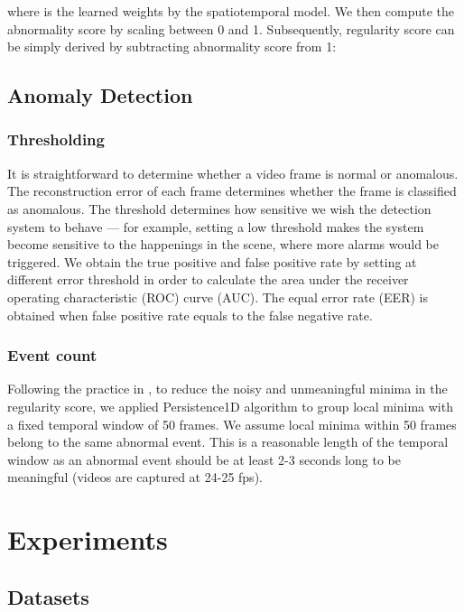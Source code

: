 \documentclass[a4paper]{article}
\begin{document}
where  is the learned weights by the spatiotemporal model. We then compute the abnormality score  by scaling  between 0 and 1. Subsequently, regularity score  can be simply derived by subtracting abnormality score from 1:





\subsection{Anomaly Detection}

\subsubsection{Thresholding} It is straightforward to determine whether a video frame is normal or anomalous. The reconstruction error of each frame determines whether the frame is classified as anomalous. The threshold determines how sensitive we wish the detection system to behave --- for example, setting a low threshold makes the system become sensitive to the happenings in the scene, where more alarms would be triggered. We obtain the true positive and false positive rate by setting at different error threshold in order to calculate the area under the receiver operating characteristic (ROC) curve (AUC). The equal error rate (EER) is obtained when false positive rate equals to the false negative rate.

\subsubsection{Event count} Following the practice in \cite{hasan2016}, to reduce the noisy and unmeaningful minima in the regularity score, we applied Persistence1D \cite{pers1d} algorithm to group local minima with a fixed temporal window of 50 frames. We assume local minima within 50 frames belong to the same abnormal event. This is a reasonable length of the temporal window as an abnormal event should be at least 2-3 seconds long to be meaningful (videos are captured at 24-25 fps).

\section{Experiments}

\subsection{Datasets}
\end{document}
